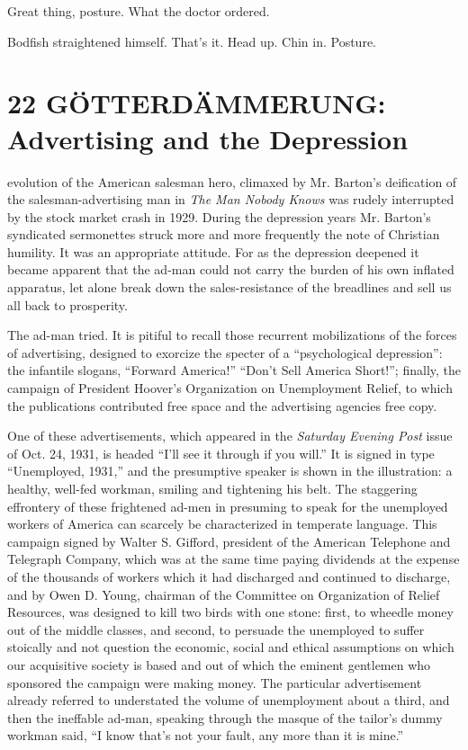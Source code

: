 \documentclass[nohyper,openany,nobib]{tufte-book}
\let\oldchapter\chapter
\def\chapter{%
  \setcounter{footnote}{0}%
  \oldchapter
}
\begin{document}
Great thing, posture. What the doctor ordered.

Bodfish straightened himself. That's it. Head up. Chin in. Posture.




\chapter[22 \hspace*{1mm} G{\"O}TTERD{\"A}MMERUNG]{22 G{\"O}TTERD{\"A}MMERUNG: Advertising and the \newline Depression}

 evolution of the American salesman hero, climaxed by Mr. Barton's
deification of the salesman-advertising man in \emph{The Man Nobody
Knows} was rudely interrupted by the stock market crash in 1929. During
the depression years Mr. Barton's syndicated sermonettes struck more and
more frequently the note of Christian humility. It was an appropriate
attitude. For as the depression deepened it became apparent that the
ad-man could not carry the burden of his own inflated apparatus, let
alone break down the sales-resistance of the breadlines and sell us all
back to prosperity.

The ad-man tried. It is pitiful to recall those recurrent mobilizations
of the forces of advertising, designed to exorcize the specter of a
``psychological depression'': the infantile slogans, ``Forward
America!'' ``Don't Sell America Short!''; finally, the campaign of
President Hoover's Organization on Unemployment Relief, to which the
publications contributed free space and the advertising agencies free
copy.

One of these advertisements, which appeared in the \emph{Saturday
Evening Post} issue of Oct. 24, 1931, is headed ``I'll see it through if
you will.'' It is signed in type ``Unemployed, 1931,'' and the
presumptive speaker is shown in the illustration: a healthy, well-fed
workman, smiling and tightening his belt. The staggering effrontery of
these frightened ad-men in presuming to speak for the unemployed workers
of America can scarcely be characterized in temperate language. This
campaign signed by Walter S. Gifford, president of the American
Telephone and Telegraph Company, which was at the same time paying
dividends at the expense of the thousands of workers which it had
discharged and continued to discharge, and by Owen D. Young, chairman of
the Committee on Organization of Relief Resources, was designed to kill
two birds with one stone: first, to wheedle money out of the middle
classes, and second, to persuade the unemployed to suffer stoically and
not question the economic, social and ethical assumptions on which our
acquisitive society is based and out of which the eminent gentlemen who
sponsored the campaign were making money. The particular advertisement
already referred to understated the volume of unemployment about a
third, and then the ineffable ad-man, speaking through the masque of the
tailor's dummy workman said, ``I know that's not your fault, any more
than it is mine.''
\end{document}
